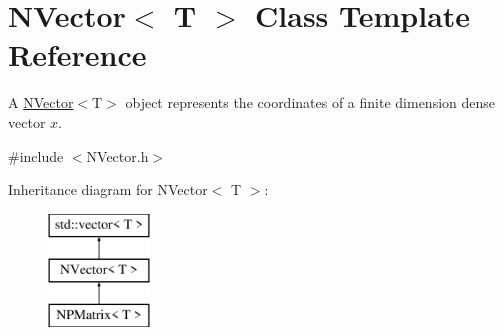 \hypertarget{class_n_vector}{}\section{N\+Vector$<$ T $>$ Class Template Reference}
\label{class_n_vector}


A {\ttfamily \mbox{\hyperlink{class_n_vector}{N\+Vector}}$<$T$>$} object represents the coordinates of a finite dimension dense vector $ x $.  




{\ttfamily \#include $<$N\+Vector.\+h$>$}

Inheritance diagram for N\+Vector$<$ T $>$\+:\begin{figure}[H]
\begin{center}
\leavevmode
\includegraphics[height=3.000000cm]{class_n_vector}
\end{center}
\end{figure}

